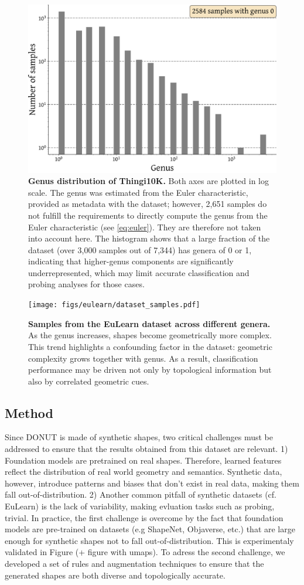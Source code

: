 \begin{figure}[h]
  \centering
  \includegraphics[width=0.5\linewidth]{figs/topogen/thingi_genus_hist.pdf}
   \caption{\textbf{Genus distribution of Thingi10K.} Both axes are plotted in log scale. The genus was estimated from the Euler characteristic, provided as metadata with the dataset; however, 2,651 samples do not fulfill the requirements to directly compute the genus from the Euler characteristic (see \ref{eq:euler}). They are therefore not taken into account here. The histogram shows that a large fraction of the dataset (over 3,000 samples out of 7,344) has genera of 0 or 1, indicating that higher-genus components are significantly underrepresented, which may limit accurate classification and probing analyses for those cases.}
   \label{fig:thingi-genus}
\end{figure}

\begin{figure}[h]
  \centering
  \texttt{[image: figs/eulearn/dataset\_samples.pdf]}
   \caption{\textbf{Samples from the EuLearn dataset across different genera.} As the genus increases, shapes become geometrically more complex. This trend highlights a confounding factor in the dataset: geometric complexity grows together with genus. As a result, classification performance may be driven not only by topological information but also by correlated geometric cues.}
   \label{fig:eulearn-samples}
\end{figure}


\subsection{Method}
\label{ssec:topogen-method}

Since DONUT is made of synthetic shapes, two critical challenges must be addressed to ensure that the results obtained from this dataset are relevant. 1) Foundation models are pretrained on real shapes. Therefore, learned features reflect the distribution of real world geometry and semantics. Synthetic data, however, introduce patterns and biases that don't exist in real data, making them fall out-of-distribution. 2) Another common pitfall of synthetic datasets (cf. EuLearn) is the lack of variability, making evluation tasks such as probing, trivial. In practice, the first challenge is overcome by the fact that foundation models are pre-trained on datasets (e.g ShapeNet, Objaverse, etc.) that are large enough for synthetic shapes not to fall out-of-distribution. This is experimentaly validated in Figure (+ figure with umaps). To adress the second challenge, we developed a set of rules and augmentation techniques to ensure that the generated shapes are both diverse and topologically accurate.

